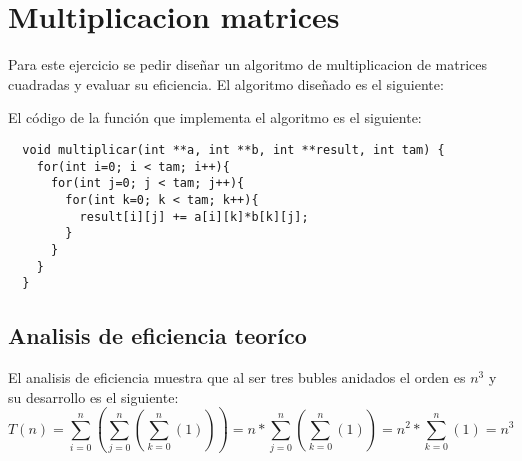 \section{Multiplicacion matrices}

Para este ejercicio se pedir diseñar un algoritmo de multiplicacion de matrices cuadradas y evaluar su eficiencia. El algoritmo diseñado es el siguiente:

El código de la función que implementa el algoritmo es el siguiente:

\begin{lstlisting}
  void multiplicar(int **a, int **b, int **result, int tam) {
    for(int i=0; i < tam; i++){ 
      for(int j=0; j < tam; j++){
        for(int k=0; k < tam; k++){
          result[i][j] += a[i][k]*b[k][j];
        }
      }
    }
  }
 \end{lstlisting}

\subsection{Analisis de eficiencia teoríco}

El analisis de eficiencia muestra que al ser tres bubles anidados el orden es $n^{3}$ y su desarrollo es el siguiente:
\begin{equation}
T(n)=\sum_{i=0}^{n}(\sum_{j=0}^{n}(\sum_{k=0}^{n}(1)))=n*\sum_{j=0}^{n}(\sum_{k=0}^{n}(1))=n^{2}*\sum_{k=0}^{n}(1)=n^{3}
\end{equation}
